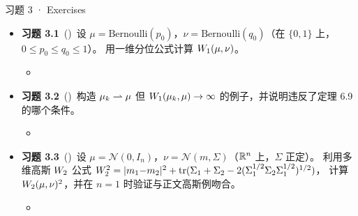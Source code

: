 \begin{frame}{习题 3 · Exercises}
  \begin{itemize}
    \item \textbf{习题 3.1}~(\diffI)\
      设 $\mu=\mathrm{Bernoulli}(p_{0})$，$\nu=\mathrm{Bernoulli}(q_{0})$（在 $\{0,1\}$ 上，$0\le p_{0}\le q_{0}\le1$）。
      用一维分位公式计算 $W_{1}(\mu,\nu)$。
      \begin{itemize}\footnotesize
        \item \hint{$F_{\mu}^{-1}(t)=\mathbf{1}_{t\ge1-p_{0}}$；差在区间 $[1-q_{0},1-p_{0})$ 上为 $1$，其余为 $0$。}
      \end{itemize}

    \item \textbf{习题 3.2}~(\diffII)\
      构造 $\mu_{k}\rightharpoonup\mu$ 但 $W_{1}(\mu_{k},\mu)\to\infty$ 的例子，并说明违反了定理 6.9 的哪个条件。
      \begin{itemize}\footnotesize
        \item {}
      \end{itemize}

    \item \textbf{习题 3.3}~(\diffIII)\
      设 $\mu=\mathcal{N}(0,I_{n})$，$\nu=\mathcal{N}(m,\Sigma)$（$\mathbb{R}^{n}$ 上，$\Sigma$ 正定）。
      利用多维高斯 $W_{2}$ 公式
      $W_{2}^{2}=|m_1{-}m_2|^{2}+\mathrm{tr}(\Sigma_1+\Sigma_2-2(\Sigma_1^{1/2}\Sigma_2\Sigma_1^{1/2})^{1/2})$，
      计算 $W_{2}(\mu,\nu)^{2}$，并在 $n=1$ 时验证与正文高斯例吻合。
      \begin{itemize}\footnotesize
        \item {}
      \end{itemize}
  \end{itemize}
\end{frame}
